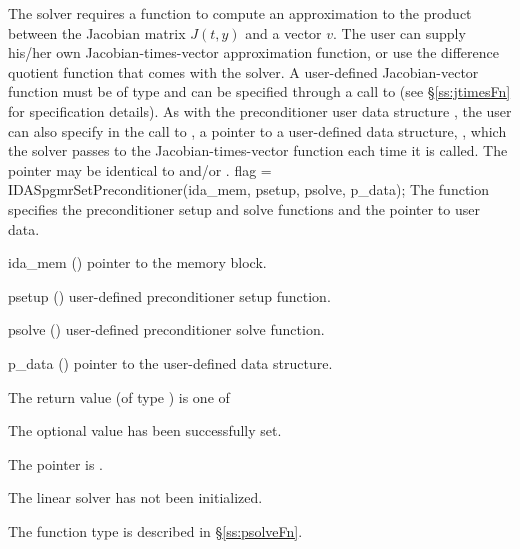 {The 
{\idaspgmr} solver requires a function to compute an approximation to the
product between the Jacobian matrix $J(t,y)$ and a vector $v$.
The user can supply his/her own Jacobian-times-vector approximation function, 
or use the difference quotient function  
that comes with the {\idaspgmr} solver.
A user-defined Jacobian-vector function must be of type 
and can be specified through a call to 
(see \S\ref{ss:jtimesFn} for specification details).
As with the preconditioner user data structure , 
the user can also specify in the call to , a pointer
to a user-defined data structure, , which
the {\idaspgmr} solver passes to the Jacobian-times-vector function 
each time it is called.  
The pointer  may be identical to  and/or .
{
  flag = IDASpgmrSetPreconditioner(ida\_mem, psetup, psolve, p\_data);
}
{
  The function  specifies the preconditioner
  setup and solve functions and the pointer to user data.
}
{
  \begin{args}
  \item[ida\_mem] ()
    pointer to the {\ida} memory block.
  \item[psetup] ()
    user-defined preconditioner setup function.
  \item[psolve] ()
    user-defined preconditioner solve function.
  \item[p\_data] ()
     pointer to the user-defined data structure.
  \end{args}
}
{
  The return value  (of type ) is one of
  \begin{args}
  \item[\Id{IDASPGMR\_SUCCESS}] 
    The optional value has been successfully set.
  \item[\Id{IDASPGMR\_MEM\_NULL}]
    The  pointer is .
  \item[\Id{IDASPGMR\_LMEM\_NULL}]
    The {\idaspgmr} linear solver has not been initialized.
  \end{args}
}
{
   The function type  is described in \S\ref{ss:psolveFn}.
}}

